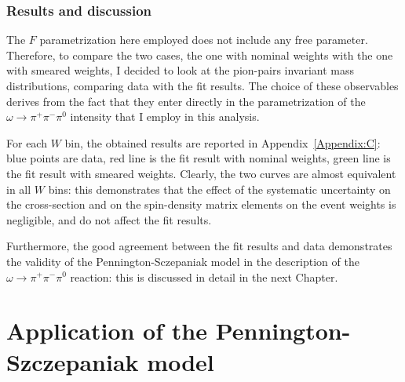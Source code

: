 \documentclass[a4paper,10pt]{report}
\newcommand{\decay}{$\omega \rightarrow \pi^+ \pi^- \pi^0$ }
\begin{document}
\subsection{Results and discussion}

The $F$ parametrization here employed does not include any free parameter. Therefore, to compare the two cases, the one with nominal weights with the one with smeared weights, I decided to look at the pion-pairs invariant mass distributions, comparing data with the fit results.
The choice of these observables derives from the fact that they enter directly in the parametrization of the \decay intensity that I employ in this analysis.

For each $W$ bin, the obtained results are reported in Appendix~\ref{Appendix:C}: blue points are data, red line is the fit result with nominal weights, green line is the fit result with smeared weights. 
Clearly, the two curves are almost equivalent in all $W$ bins: this demonstrates that the effect of the systematic uncertainty on the cross-section and on the spin-density matrix elements on the event weights is negligible, and do not affect the fit results.

Furthermore, the good agreement between the fit results and data demonstrates the validity of the Pennington-Sczepaniak model in the description of the \decay reaction: this is discussed in detail in the next Chapter.


\chapter{Application of the Pennington-Szczepaniak model}
\end{document}
